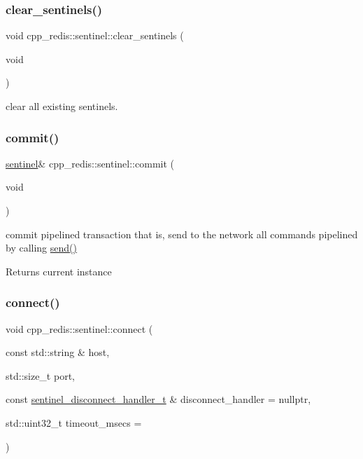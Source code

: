 \subsubsection{\texorpdfstring{clear\+\_\+sentinels()}{clear\_sentinels()}}
{\footnotesize\ttfamily void cpp\+\_\+redis\+::sentinel\+::clear\+\_\+sentinels (\begin{DoxyParamCaption}\item[{void}]{ }\end{DoxyParamCaption})}

clear all existing sentinels. \mbox{\label{classcpp__redis_1_1sentinel_ad4f85d486499f82225b244f85091b31e}} 
\subsubsection{\texorpdfstring{commit()}{commit()}}
{\footnotesize\ttfamily \hyperlink{classcpp__redis_1_1sentinel}{sentinel}\& cpp\+\_\+redis\+::sentinel\+::commit (\begin{DoxyParamCaption}\item[{void}]{ }\end{DoxyParamCaption})}

commit pipelined transaction that is, send to the network all commands pipelined by calling \hyperlink{classcpp__redis_1_1sentinel_a0df522dbd7debda4e73f616a62d6f5ee}{send()}

\begin{DoxyReturn}{Returns}
current instance 
\end{DoxyReturn}
\mbox{\label{classcpp__redis_1_1sentinel_a1dfba8240daf7cfa7502f57957cffbda}} 
\subsubsection{\texorpdfstring{connect()}{connect()}}
{\footnotesize\ttfamily void cpp\+\_\+redis\+::sentinel\+::connect (\begin{DoxyParamCaption}\item[{const std\+::string \&}]{host,  }\item[{std\+::size\+\_\+t}]{port,  }\item[{const \hyperlink{classcpp__redis_1_1sentinel_a923e06b5b700c16dffec8a01d2fa9aa4}{sentinel\+\_\+disconnect\+\_\+handler\+\_\+t} \&}]{disconnect\+\_\+handler = {\ttfamily nullptr},  }\item[{std\+::uint32\+\_\+t}]{timeout\+\_\+msecs = {} }\end{DoxyParamCaption})}

